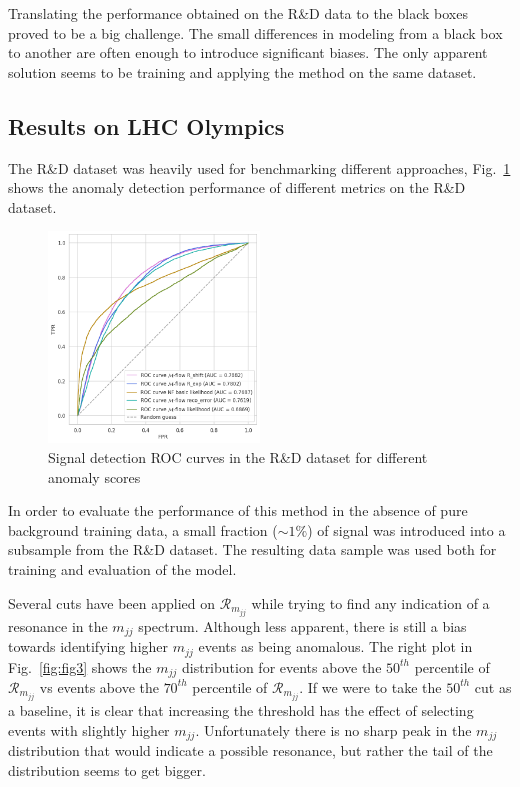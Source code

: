 \documentclass[letterpaper,11pt]{article}
\begin{document}
Translating the performance obtained on the R\&D data to the black boxes proved to be a big challenge. The small differences in modeling from a black box to another are often enough to introduce significant biases. The only apparent solution seems to be training and applying the method on the same dataset.

\subsection{Results on LHC Olympics}
\label{sec:results}

The R\&D dataset was heavily used for benchmarking different approaches, Fig.~\ref{fig:fig2} shows the anomaly detection performance of different metrics on the R\&D dataset. 

\begin{figure}[h!]
    \centering
    \includegraphics[width=0.5\textwidth]{img/mf_roc_all.png}
    \caption{Signal detection ROC curves in the R\&D dataset for different anomaly scores}
    \label{fig:fig2}
\end{figure}

In order to evaluate the performance of this method in the absence of pure background training data, a small fraction ($\sim 1\%$) of signal was introduced into a subsample from the R\&D dataset. The resulting data sample was used both for training and evaluation of the model.

Several cuts have been applied on $\mathcal{R}_{m_{jj}}$ while trying to find any indication of a resonance in the $m_{jj}$ spectrum. Although less apparent, there is still a bias towards identifying higher $m_{jj}$ events as being anomalous. The right plot in Fig.~\ref{fig:fig3} shows the $m_{jj}$ distribution for events above the $50^{th}$ percentile of $\mathcal{R}_{m_{jj}}$ vs events above the $70^{th}$ percentile of $\mathcal{R}_{m_{jj}}$. If we were to take the $50^{th}$ cut as a baseline, it is clear that increasing the threshold has the effect of selecting events with slightly higher $m_{jj}$. Unfortunately there is no sharp peak in the $m_{jj}$ distribution that would indicate a possible resonance, but rather the tail of the distribution seems to get bigger.
\end{document}
